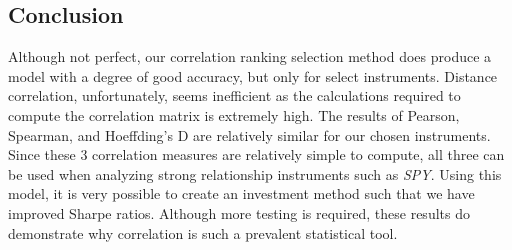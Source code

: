 \documentclass[10pt]{siamltex}
\newcounter{ale}
\begin{document}
\subsection{Conclusion}
Although not perfect, our correlation ranking selection method does produce a model with a degree of good accuracy, but only for select instruments. Distance correlation, unfortunately, seems inefficient as the calculations required to compute the correlation matrix is extremely high. The results of Pearson, Spearman, and Hoeffding's D are relatively similar for our chosen instruments. Since these 3 correlation measures are relatively simple to compute, all three can be used when analyzing strong relationship instruments such as \textit{SPY}.  Using this model, it is very possible to create an investment method such that we have improved Sharpe ratios. Although more testing is required, these results do demonstrate why correlation is such a prevalent statistical tool. 



\end{document}
